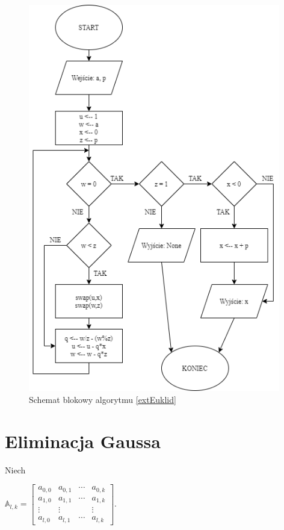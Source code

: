 \documentclass[]{article}
\begin{document}
	\begin{figure}[H]
		\begin{center}
			\includegraphics[width=11cm]{alg 8.png} \caption{Schemat blokowy algorytmu \ref{extEuklid}}
		\end{center}
	\end{figure}


	\section{Eliminacja Gaussa}
		Niech 
		\newline
		\begin{center}
			\(\mathbb{A}_{l,k} = 
			\begin{bmatrix}
				a_{0,0} & a_{0,1} & \cdots & a_{0,k} \\
				a_{1,0} & a_{1,1} & \cdots & a_{1,k} \\
				\vdots & \vdots & & \vdots \\
				a_{l,0} & a_{l,1} & \cdots & a_{l,k} 
			\end{bmatrix} \). 
		\end{center}
\end{document}
